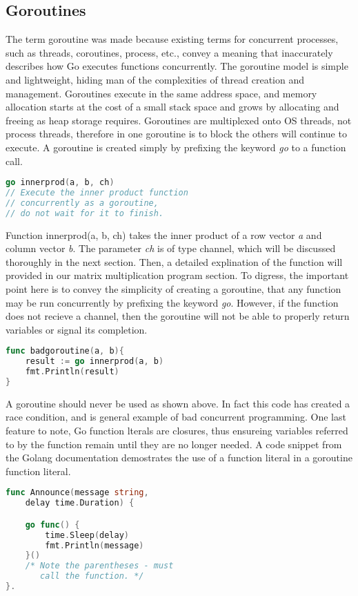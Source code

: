 \subsection{Goroutines}
	The term goroutine was made because existing terms for concurrent processes, such as threads, coroutines, process, etc., convey a meaning that inaccurately describes how Go executes functions concurrently. The goroutine model is simple and lightweight, hiding man of the complexities of thread creation and management. Goroutines execute in the same address space, and memory allocation starts at the cost of a small stack space and grows by allocating and freeing as heap storage requires. Goroutines are multiplexed onto OS threads, not process threads, therefore in one goroutine is to block the others will continue to execute.\cite{website:go-lang-documentation}
	A goroutine is created simply by prefixing the keyword \emph{go} to a function call.
\begin{lstlisting}[language=Go]
go innerprod(a, b, ch)
// Execute the inner product function
// concurrently as a goroutine,
// do not wait for it to finish.
\end{lstlisting}
Function innerprod(a, b, ch) takes the inner product of a row vector \emph{a} and column vector \emph{b}. The parameter \emph{ch} is of type channel, which will be discussed thoroughly in the next section. Then, a detailed explination of the function will provided in our matrix multiplication program section. To digress, the important point here is to convey the simplicity of creating a goroutine, that any function may be run concurrently by prefixing the keyword \emph{go}. However, if the function does not recieve a channel, then the goroutine will not be able to properly return variables or signal its completion.
\begin{lstlisting}[language=Go]
func badgoroutine(a, b){
	result := go innerprod(a, b)
	fmt.Println(result)
}
\end{lstlisting}
A goroutine should never be used as shown above. In fact this code has created a race condition, and is general example of bad concurrent programming.
	One last feature to note, Go function lterals are closures, thus ensureing variables referred to by the function remain until they are no longer needed. A code snippet from the Golang documentation demostrates the use of a function literal in a goroutine function literal.
\begin{lstlisting}[language=Go]
func Announce(message string,
	delay time.Duration) {

    go func() {
        time.Sleep(delay)
        fmt.Println(message)
    }()
    /* Note the parentheses - must
       call the function. */
}.
\end{lstlisting}
